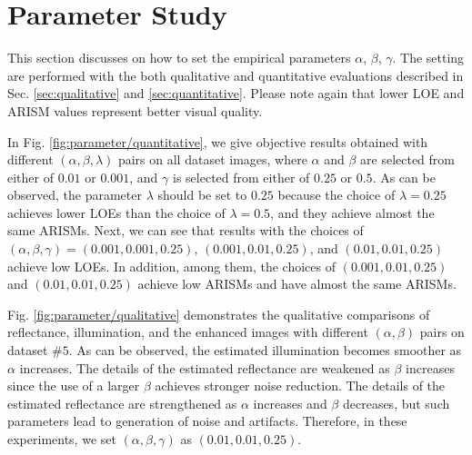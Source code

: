 \section{Parameter Study}
This section discusses on how to set the empirical parameters $\alpha$, $\beta$, $\gamma$. The setting are performed with the both qualitative and quantitative evaluations described in Sec. \ref{sec:qualitative} and \ref{sec:quantitative}. Please note again that lower LOE and ARISM values represent better visual quality.\par
In Fig. \ref{fig:parameter/quantitative}, we give objective results obtained with different $(\alpha, \beta, \lambda)$ pairs on all dataset images, where $\alpha$ and $\beta$ are selected from either of $0.01$ or $0.001$, and $\gamma$ is selected from either of $0.25$ or $0.5$. As can be observed, the parameter $\lambda$ should be set to $0.25$ because the choice of $\lambda=0.25$ achieves lower LOEs than the choice of $\lambda=0.5$, and they achieve almost the same ARISMs. Next, we can see that results with the choices of $(\alpha, \beta, \gamma) = (0.001, 0.001, 0.25)$, $(0.001, 0.01, 0.25)$, and $(0.01, 0.01, 0.25)$ achieve low LOEs. In addition, among them, the choices of $(0.001, 0.01, 0.25)$ and $(0.01, 0.01, 0.25)$ achieve low ARISMs and have almost the same ARISMs.\par
Fig. \ref{fig:parameter/qualitative} demonstrates the qualitative comparisons of reflectance, illumination, and the enhanced images with different $(\alpha, \beta)$ pairs on dataset $\#5$. As can be observed, the estimated illumination becomes smoother as $\alpha$ increases. The details of the estimated reflectance are weakened as $\beta$ increases since the use of a larger $\beta$ achieves stronger noise reduction. The details of the estimated reflectance are strengthened as $\alpha$ increases and $\beta$ decreases, but such parameters lead to generation of noise and artifacts. Therefore, in these experiments, we set $(\alpha, \beta, \gamma)$ as $(0.01, 0.01, 0.25)$.
